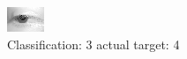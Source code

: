 \begin{figure}[h!]
\begin{center}
\includegraphics[width=0.60\columnwidth]{figures/ID2720_class_3_target_4.png}
\end{center}
\caption{ Classification: 3 actual target: 4}
\label{fig:ID2720_class_3_target_4}
\end{figure}
